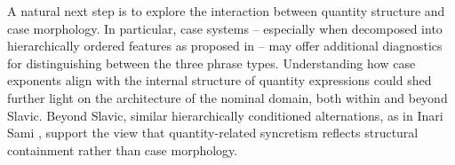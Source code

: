 \documentclass[output=paper,colorlinks,citecolor=brown
]{langscibook}
\begin{document}
A natural next step is to explore the interaction between quantity structure and case morphology. In particular, case systems -- especially when decomposed into hierarchically ordered features as proposed in \citet{Caha2009} -- may offer additional diagnostics for distinguishing between the three phrase types. Understanding how case exponents align with the internal structure of quantity expressions could shed further light on the architecture of the nominal domain, both within and beyond Slavic. Beyond Slavic, similar hierarchically conditioned alternations, as in Inari Sami \citep{NelsonToivonen2000}, 
support the view that quantity-related syncretism reflects structural containment rather than case morphology.

\sloppy
\printbibliography[heading=subbibliography,notkeyword=this]
\end{document}
